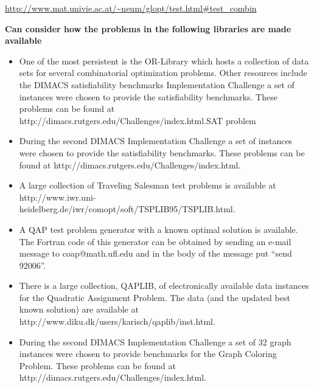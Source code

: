 \documentclass[a4paper]{article}
\begin{document}
 \url{http://www.mat.univie.ac.at/~neum/glopt/test.html\#test_combin}
  
{\bf Can consider how the problems in the following libraries are made available}

\begin{itemize}
\item One of the most persistent is the OR-Library \citep{OR1990} which hosts a collection of data sets for several combinatorial optimization problems. Other resources include the DIMACS satisfiability benchmarks Implementation Challenge a set of instances were chosen to provide the satisfiability benchmarks. These problems can be found at http://dimacs.rutgers.edu/Challenges/index.html.SAT problem 


\item During the second DIMACS Implementation Challenge a set of instances were chosen to provide the satisfiability benchmarks. These problems can be found at http://dimacs.rutgers.edu/Challenges/index.html.

\item A large collection of Traveling Salesman test problems is available at http://www.iwr.uni-heidelberg.de/iwr/comopt/soft/TSPLIB95/TSPLIB.html.

\item A QAP test problem generator with a known optimal solution is available. The Fortran code of this generator can be obtained by sending an e-mail message to coap@math.ufl.edu and in the body of the message put ``send 92006''.

\item There is a large collection, QAPLIB, of electronically available data instances for the Quadratic Assignment Problem. The data (and the updated best known solution) are available at http://www.diku.dk/users/karisch/qaplib/inst.html.


\item During the second DIMACS Implementation Challenge a set of 32 graph instances were chosen to provide benchmarks for the Graph Coloring Problem. These problems can be found at http://dimacs.rutgers.edu/Challenges/index.html.
\end{itemize}







\end{document}
